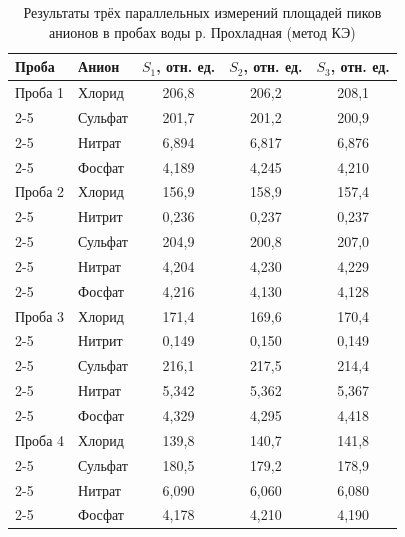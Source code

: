 \label{app:raw_prohladnaya}
\begin{table}[H]
\centering
\caption{Результаты трёх параллельных измерений площадей пиков анионов в пробах воды р. Прохладная (метод КЭ)}
\begin{tabular}{|l|l|c|c|c|}
\hline
Проба & Анион & $S_1$, отн. ед. & $S_2$, отн. ед. & $S_3$, отн. ед. \\
\hline
Проба 1      & Хлорид  & 206,8 & 206,2 & 208,1 \\ \cline{2-5}
             & Сульфат & 201,7 & 201,2 & 200,9 \\ \cline{2-5}
             & Нитрат  & 6,894 & 6,817 & 6,876 \\ \cline{2-5}
             & Фосфат  & 4,189 & 4,245 & 4,210 \\
\hline
Проба 2      & Хлорид  & 156,9 & 158,9 & 157,4 \\ \cline{2-5}
             & Нитрит  & 0,236 & 0,237 & 0,237 \\ \cline{2-5}
             & Сульфат & 204,9 & 200,8 & 207,0 \\ \cline{2-5}
             & Нитрат  & 4,204 & 4,230 & 4,229 \\ \cline{2-5}
             & Фосфат  & 4,216 & 4,130 & 4,128 \\
\hline
Проба 3      & Хлорид  & 171,4 & 169,6 & 170,4 \\ \cline{2-5}
             & Нитрит  & 0,149 & 0,150 & 0,149 \\ \cline{2-5}
             & Сульфат & 216,1 & 217,5 & 214,4 \\ \cline{2-5}
             & Нитрат  & 5,342 & 5,362 & 5,367 \\ \cline{2-5}
             & Фосфат  & 4,329 & 4,295 & 4,418 \\
\hline
Проба 4      & Хлорид  & 139,8 & 140,7 & 141,8 \\ \cline{2-5}
             & Сульфат & 180,5 & 179,2 & 178,9 \\ \cline{2-5}
             & Нитрат  & 6,090 & 6,060 & 6,080 \\ \cline{2-5}
             & Фосфат  & 4,178 & 4,210 & 4,190 \\
\hline
\end{tabular}
\end{table}

